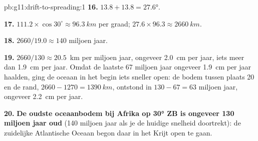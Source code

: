 \begin{solution}{pb:g11:drift-to-spreading:1}
\textbf{16.} $13.8 + 13.8 = \ang{27.6}$.

\textbf{17.} $111.2 \times \cos 30^\circ \approx \qty{96.3}{km}$ per graad;
$27.6 \times 96.3 \approx \qty{2660}{km}$.

\textbf{18.} $2660/19.0 \approx 140$ miljoen jaar.

\textbf{19.} $2660/130 \approx \num{20.5}$~km per miljoen jaar, ongeveer
\qty{2.0}{cm} per jaar, iets meer dan \qty{1.9}{cm} per jaar. Omdat de laatste
67 miljoen jaar ongeveer \qty{1.9}{cm} per jaar haalden, ging de oceaan in het
begin iets sneller open: de bodem tussen plaats 20 en de rand, $2660 - 1270 =
\qty{1390}{km}$, ontstond in $130 - 67 = 63$ miljoen jaar, ongeveer
\qty{2.2}{cm} per jaar.

\textbf{20.} \textbf{De oudste oceaanbodem bij Afrika op \ang{30} ZB is ongeveer
130 miljoen jaar oud} (140 miljoen jaar als je de huidige snelheid doortrekt): de
zuidelijke Atlantische Oceaan begon daar in het Krijt open te gaan.
\end{solution}
